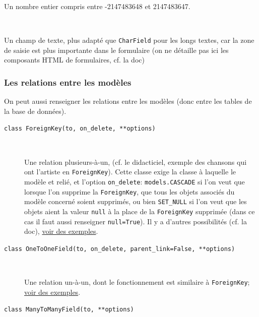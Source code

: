 \documentclass[a4paper, 10pt]{article}
\begin{document}
{\begin{description}
	      Un nombre entier compris entre -2147483648 et 2147483647.

	\item[\texttt{class TextField(**options)}]~

	      Un champ de texte, plus adapté que \texttt{CharField} pour les longs textes, car la zone de saisie est plus importante dans le formulaire (on ne détaille pas ici les composants HTML de formulaires, cf. la doc)
\end{description}

\subsubsection{Les relations entre les modèles}

On  peut aussi renseigner les relations entre les modèles (donc entre les tables de la base de données).
\begin{description}
	\item[\texttt{class ForeignKey(to, on_delete, **options)}]~

	      Une relation plusieurs-à-un, (cf. le didacticiel, exemple des chansons qui ont l'artiste en \texttt{ForeignKey}). Cette classe exige la classe à laquelle le modèle et relié, et l'option \texttt{on\_delete}: \texttt{models.CASCADE} si l'on veut que lorsque l'on supprime la \texttt{ForeignKey}, que tous les objets associés du modèle concerné soient supprimés, ou bien \texttt{SET\_NULL} si l'on veut que les objets aient la valeur \texttt{null} à la place de la \texttt{ForeignKey} supprimée (dans ce cas il faut aussi renseigner \texttt{null=True}). Il y a d'autres possibilités (cf. la doc), \href{https://docs.djangoproject.com/fr/2.0/topics/db/examples/many_to_one/}{voir des exemples}.

	\item[\texttt{class OneToOneField(to, on_delete, parent_link=False, **options)}]~

	      Une relation un-à-un, dont le fonctionnement est similaire à \texttt{ForeignKey}; \href{https://docs.djangoproject.com/fr/2.0/topics/db/examples/one_to_one/}{voir des exemples}.

	\item[\texttt{class ManyToManyField(to, **options)}]~


\end{description}}
\end{document}
